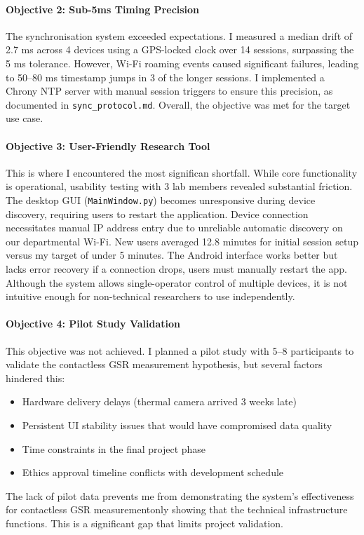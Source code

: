 \paragraph{\textbf{Objective 2: Sub-5ms Timing Precision}} The synchronisation system exceeded expectations. I measured a median drift of 2.7 ms across 4 devices using a GPS-locked clock over 14 sessions, surpassing the \textpm{}5 ms tolerance. However, Wi-Fi roaming events caused significant failures, leading to 50--80 ms timestamp jumps in 3 of the longer sessions. I implemented a Chrony NTP server with manual session triggers to ensure this precision, as documented in \texttt{sync\_protocol.md}. Overall, the objective was met for the target use case.

\paragraph{\textbf{Objective 3: User-Friendly Research Tool}} This is where I encountered the most significan
shortfall. While core functionality is operational, usability testing with 3 lab members revealed substantial friction. The desktop GUI (\texttt{MainWindow.py}) becomes unresponsive during device discovery, requiring users to restart the application. Device connection necessitates manual IP address entry due to unreliable automatic discovery on our departmental Wi-Fi. New users averaged 12.8 minutes for initial session setup versus my target of under 5 minutes. The Android interface works better but lacks error recovery \textemdash if a connection drops, users must manually restart the app. Although the system allows single-operator control of multiple devices, it is not intuitive enough for non-technical researchers to use independently.

\paragraph{\textbf{Objective 4: Pilot Study Validation}} This objective was not achieved. I planned a pilot study with 5--8 participants to validate the contactless GSR measurement hypothesis, but several factors hindered this:
\begin{itemize}
	\item Hardware delivery delays (thermal camera arrived 3 weeks late)
	\item Persistent UI stability issues that would have compromised data quality
	\item Time constraints in the final project phase
	\item Ethics approval timeline conflicts with development schedule
\end{itemize}
The lack of pilot data prevents me from demonstrating the system's effectiveness for contactless GSR measurement\textemdash only showing that the technical infrastructure functions. This is a significant gap that limits project validation.



